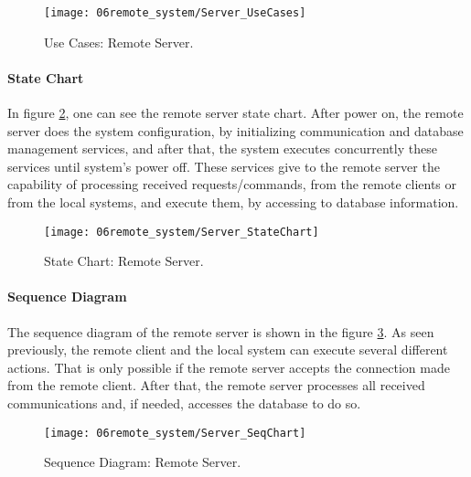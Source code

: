\begin{figure}[H]
	\centering
	\texttt{[image: 06remote\_system/Server\_UseCases]}
	\caption{Use Cases: Remote Server.}
	\label{fig:UseCases_Server}
\end{figure}

\paragraph*{State Chart}
In figure \ref{fig:StateChart_Server}, one can see the remote server state chart. After power on, the remote server does the system configuration, by initializing communication and database management services, and after that, the system executes concurrently these services until system's power off. These services give to the remote server the capability of processing received requests/commands, from the remote clients or from the local systems, and execute them, by accessing to database information.

\begin{figure}[H]
	\centering
	\texttt{[image: 06remote\_system/Server\_StateChart]}
	\caption{State Chart: Remote Server.}
	\label{fig:StateChart_Server}
\end{figure}

\paragraph*{Sequence Diagram}
The sequence diagram of the remote server is shown in the figure \ref{fig:SeqDiagram_Server}. As seen previously, the remote client and the local system can execute several different actions. That is only possible if the remote server accepts the connection made from the remote client. After that, the remote server processes all received communications and, if needed, accesses the database to do so.

\begin{figure}[H]
	\centering
	\texttt{[image: 06remote\_system/Server\_SeqChart]}
	\caption{Sequence Diagram: Remote Server.}
	\label{fig:SeqDiagram_Server}
\end{figure}